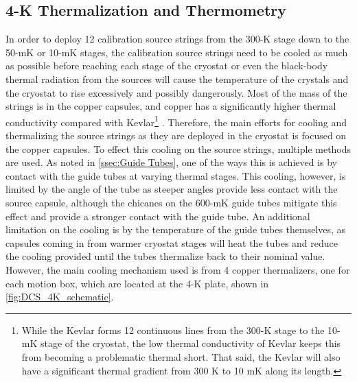 \subsection*{4-K Thermalization and Thermometry}
\label{ssec:Thermalization_and_Thermometry}
In order to deploy 12 calibration source strings from the 300-K stage down to the 50-mK or 10-mK stages, the calibration source strings need to be cooled as much as possible before reaching each stage of the cryostat or even the black-body thermal radiation from the sources will cause the temperature of the crystals and the cryostat to rise excessively and possibly dangerously.
Most of the mass of the strings is in the copper capsules, and copper has a significantly higher thermal conductivity compared with Kevlar\footnote{While the Kevlar forms 12 continuous lines from the 300-K stage to the 10-mK stage of the cryostat, the low thermal conductivity of Kevlar keeps this from becoming a problematic thermal short.
That said, the Kevlar will also have a significant thermal gradient from 300 K to 10 mK along its length.} \cite{Cu_thermal_conductivity, VENTURA2009735}.
Therefore, the main efforts for cooling and thermalizing the source strings as they are deployed in the cryostat is focused on the copper capsules.
To effect this cooling on the source strings, multiple methods are used. 
As noted in \autoref{ssec:Guide Tubes}, one of the ways this is achieved is by contact with the guide tubes at varying thermal stages.
This cooling, however, is limited by the angle of the tube as steeper angles provide less contact with the source capsule, although the chicanes on the 600-mK guide tubes mitigate this effect and provide a stronger contact with the guide tube.
An additional limitation on the cooling is by the temperature of the guide tubes themselves, as capsules coming in from warmer cryostat stages will heat the tubes and reduce the cooling provided until the tubes thermalize back to their nominal value.
However, the main cooling mechanism used is from 4 copper thermalizers, one for each motion box, which are located at the 4-K plate, shown in \autoref{fig:DCS_4K_schematic}.

